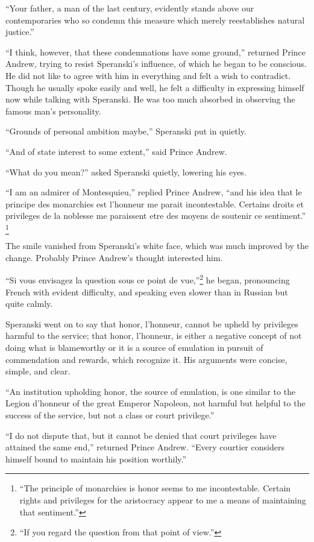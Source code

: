``Your father, a man of the last century, evidently stands above
our contemporaries who so condemn this measure which merely
reestablishes natural justice.''

``I think, however, that these condemnations have some ground,''
returned Prince Andrew, trying to resist Speranski's influence,
of which he began to be conscious. He did not like to agree with
him in everything and felt a wish to contradict. Though he
usually spoke easily and well, he felt a difficulty in expressing
himself now while talking with Speranski. He was too much
absorbed in observing the famous man's personality.

``Grounds of personal ambition maybe,'' Speranski put in quietly.

``And of state interest to some extent,'' said Prince Andrew.

``What do you mean?'' asked Speranski quietly, lowering his eyes.

``I am an admirer of Montesquieu,'' replied Prince Andrew, ``and
his idea that le principe des monarchies est l'honneur me parait
incontestable.  Certains droits et privileges de la noblesse me
paraissent etre des moyens de soutenir ce sentiment.''
\footnote{``The principle of monarchies is honor seems to me
incontestable.  Certain rights and privileges for the aristocracy
appear to me a means of maintaining that sentiment.''}

The smile vanished from Speranski's white face, which was much
improved by the change. Probably Prince Andrew's thought
interested him.

``Si vous envisagez la question sous ce point de
vue,''\footnote{``If you regard the question from that point of
view.''} he began, pronouncing French with evident difficulty,
and speaking even slower than in Russian but quite calmly.

Speranski went on to say that honor, l'honneur, cannot be upheld
by privileges harmful to the service; that honor, l'honneur, is
either a negative concept of not doing what is blameworthy or it
is a source of emulation in pursuit of commendation and rewards,
which recognize it.  His arguments were concise, simple, and
clear.

``An institution upholding honor, the source of emulation, is one
similar to the Legion d'honneur of the great Emperor Napoleon,
not harmful but helpful to the success of the service, but not a
class or court privilege.''

``I do not dispute that, but it cannot be denied that court
privileges have attained the same end,'' returned Prince
Andrew. ``Every courtier considers himself bound to maintain his
position worthily.''

